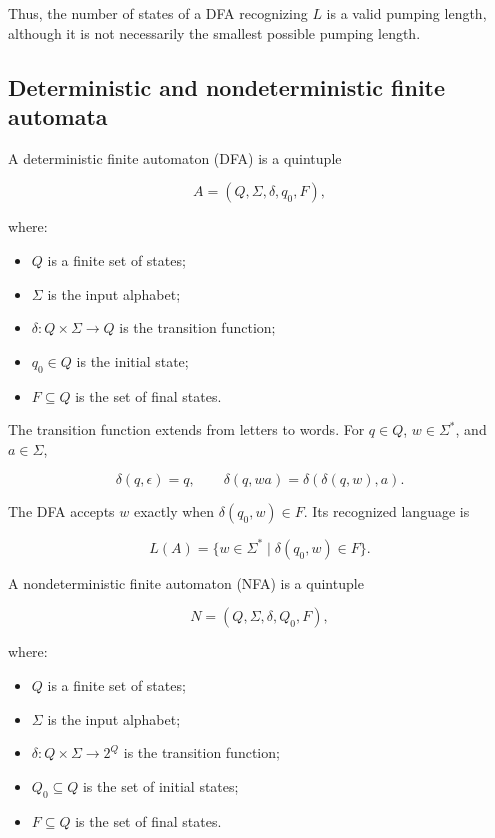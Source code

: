 \documentclass[11pt]{article}
\begin{document}
Thus, the number of states of a DFA recognizing $L$ is a valid pumping length, although it is not necessarily the smallest possible pumping length.

\subsection{Deterministic and nondeterministic finite automata}


A deterministic finite automaton (DFA) is a quintuple

\[
A=(Q,\Sigma,\delta,q_0,F),
\]

where:

\begin{itemize}
\item $Q$ is a finite set of states;
\item $\Sigma$ is the input alphabet;
\item $\delta:Q\times\Sigma\rightarrow Q$ is the transition function;
\item $q_0\in Q$ is the initial state;
\item $F\subseteq Q$ is the set of final states.

\end{itemize}

The transition function extends from letters to words. For $q\in Q$, $w\in\Sigma^*$, and $a\in\Sigma$,

\[
\delta(q,\epsilon)=q,\qquad
\delta(q,wa)=\delta(\delta(q,w),a).
\]

The DFA accepts $w$ exactly when $\delta(q_0,w)\in F$. Its recognized language is

\[
L(A)=\{w\in\Sigma^*\mid\delta(q_0,w)\in F\}.
\]

A nondeterministic finite automaton (NFA) is a quintuple

\[
N=(Q,\Sigma,\delta,Q_0,F),
\]

where:

\begin{itemize}
\item $Q$ is a finite set of states;
\item $\Sigma$ is the input alphabet;
\item $\delta:Q\times\Sigma\rightarrow 2^Q$ is the transition function;
\item $Q_0\subseteq Q$ is the set of initial states;
\item $F\subseteq Q$ is the set of final states.

\end{itemize}
\end{document}
